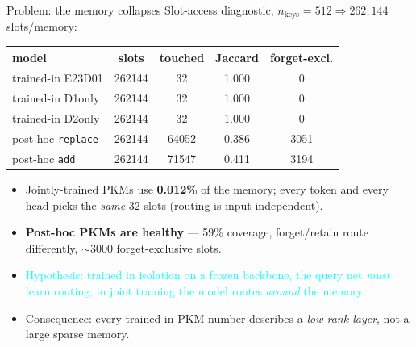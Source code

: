 \documentclass{beamer}
\newcommand{\pierre}[1]{\textcolor{cyan}{#1}}
\begin{document}
\begin{frame}{\alert{Problem: the memory collapses}}
Slot-access diagnostic, $n_{\text{keys}}=512 \Rightarrow 262{,}144$ slots/memory:
\begin{center}
\begin{tabular}{|l|c|c|c|c|}
\hline
model & slots & touched & Jaccard & forget-excl. \\
\hline
trained-in E23D01 & 262144 & \alert{32} & \alert{1.000} & \alert{0} \\
trained-in D1only & 262144 & \alert{32} & \alert{1.000} & \alert{0} \\
trained-in D2only & 262144 & \alert{32} & \alert{1.000} & \alert{0} \\
post-hoc \texttt{replace} & 262144 & 64052 & 0.386 & 3051 \\
post-hoc \texttt{add}     & 262144 & 71547 & 0.411 & 3194 \\
\hline
\end{tabular}
\end{center}

\begin{itemize}
  \item Jointly-trained PKMs use \textbf{0.012\%} of the memory; every token and
        every head picks the \emph{same} 32 slots (routing is input-independent).
  \item \textbf{Post-hoc PKMs are healthy} --- 59\% coverage, forget/retain route
        differently, $\sim$3000 forget-exclusive slots.
  \item \pierre{Hypothesis: trained in isolation on a frozen backbone, the query
        net \emph{must} learn routing; in joint training the model routes
        \emph{around} the memory.}
  \item Consequence: every trained-in PKM number describes a \emph{low-rank
        layer}, not a large sparse memory.
\end{itemize}
\end{frame}
\end{document}
